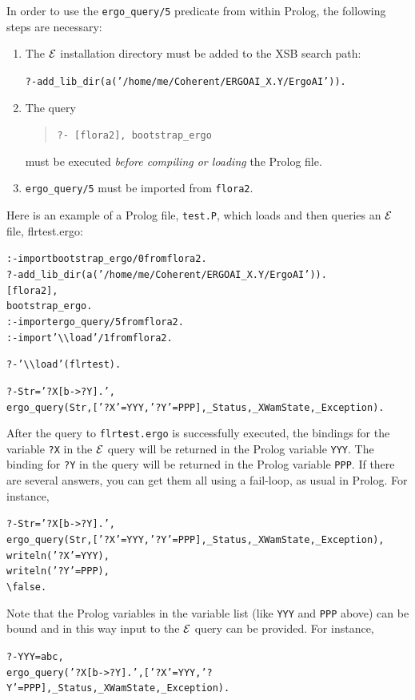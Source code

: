 \documentclass[11pt]{article}
\newcommand{\ERGO}{\mbox{\ensuremath{\cal{E}}\smaller{{\sc{RGO}}}}\xspace}
\newcommand{\FLSYSTEM}{\ERGO}
\newcommand{\FLBOOTSTRAP}{bootstrap\_ergo}
\newcommand{\FLQUERYCMD}{ergo\_query}
\newcommand{\ergoext}{ergo\xspace}
\newcommand{\bs}{\textbackslash}
\begin{document}
In order to use the
\texttt{\FLQUERYCMD/5}
predicate from within Prolog,
the following steps are necessary:
\begin{enumerate}
  \item The \FLSYSTEM installation directory must be added to
    the XSB search path:
\begin{alltt}
 ?- add_lib_dir(a('/home/me/Coherent/ERGOAI_X.Y/ErgoAI')).  
\end{alltt}
  \item The query
    \begin{quote}
      {\tt ?- [flora2], \FLBOOTSTRAP} 
    \end{quote}
    must be executed \emph{before compiling or loading} the Prolog file.
  \item \texttt{\FLQUERYCMD/5}
    must be imported from {\tt flora2}.  
\end{enumerate}
Here is an example of a Prolog file, {\tt test.P}, which loads and then
queries an \FLSYSTEM file, flrtest.\ergoext:
\begin{alltt}
:- import \FLBOOTSTRAP/0 from flora2.
?- add_lib_dir(a('/home/me/Coherent/ERGOAI_X.Y/ErgoAI')).  
   [flora2],
   \FLBOOTSTRAP. 
:- import \FLQUERYCMD/5 from flora2.
:- import '\bs{}\bs{}load'/1 from flora2.

?- '\bs{}\bs{}load'(flrtest).  

?- Str='?X[b->?Y].',
   \FLQUERYCMD(Str,['?X'=YYY,'?Y'=PPP], _Status,_XWamState,_Exception).
\end{alltt}
After the query to {\tt flrtest.\ergoext} is successfully executed, the bindings
for the variable {\tt ?X} in the \FLSYSTEM query will be returned in the Prolog
variable {\tt YYY}. The binding  for {\tt ?Y} in the query will be returned in the
Prolog variable {\tt PPP}. If there are several answers, you can get them
all using a fail-loop, as usual in Prolog. For instance, 
\begin{alltt}
?- Str='?X[b->?Y].',
   \FLQUERYCMD(Str,['?X'=YYY,'?Y'=PPP], _Status,_XWamState,_Exception),
   writeln('?X' = YYY),
   writeln('?Y' = PPP),
   \bs{}false.
\end{alltt}
Note that the Prolog variables in the variable list (like {\tt YYY} and
{\tt PPP} above) can be bound and in this way input to the \FLSYSTEM query  
can be provided. For instance, 
\begin{alltt}
?- YYY=abc,
   \FLQUERYCMD('?X[b->?Y].',['?X'=YYY,'?Y'=PPP],_Status,_XWamState,_Exception).
\end{alltt}
\end{document}
